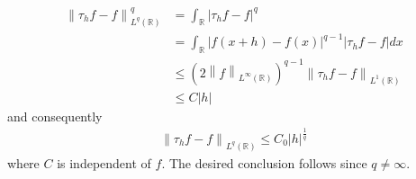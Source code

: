 \documentclass[a4paper,oneside]{book}
\numberwithin{equation}{chapter}
\begin{document}
\begin{align}
\left\| {{\tau _h}f - f} \right\|_{{L^q}\left( {\mathbb{R}} \right)}^q &= \int_{\mathbb{R}} {{{\left| {{\tau _h}f - f} \right|}^q}} \\
& = \int_{\mathbb{R}} {{{\left| {f\left( {x + h} \right) - f\left( x \right)} \right|}^{q - 1}}\left| {{\tau _h}f - f} \right|dx} \\
& \le {\left( {2{{\left\| f \right\|}_{{L^\infty }\left( {\mathbb{R}} \right)}}} \right)^{q - 1}}{\left\| {{\tau _h}f - f} \right\|_{{L^1}\left( {\mathbb{R}} \right)}}\\
&\le C\left| h \right|
\end{align}
and consequently
\begin{align}
\label{1.305}
{\left\| {{\tau _h}f - f} \right\|_{{L^q}\left( \mathbb{R} \right)}} \le C_0{\left| h \right|^{\frac{1}{q}}}
\end{align}
where $C$ is independent of $f$. The desired conclusion follows since $q\ne \infty$.
\end{document}
